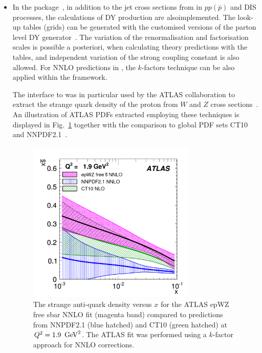 \begin{itemize}
\item In the \applgrid package~\cite{Carli:2010rw,APPLGRID:HepForge},
    in addition to the jet cross sections from \nlojetpp 
    in $pp(\bar p)$ and DIS processes, the calculations 
    of DY production are alsoimplemented. The look-up tables (grids) can be generated with
    the customised versions of the \mcfm parton level DY
    generator~\cite{Campbell:1999ah,Campbell:2000je,Campbell:2010ff}.  
    The variation of the renormalisation and factorisation scales is possible a posteriori,
    when calculating theory predictions with the \applgrid  tables, and
    independent variation of the strong coupling constant is also allowed.
    For NNLO predictions in \fitter, the $k$-factors technique can be also applied
    within the \applgrid framework.

    The \fitter interface to \applgrid was in particular used by the ATLAS
    collaboration to extract the strange quark density of the proton
    from $W$ and $Z$ cross sections~\cite{atlas:strange}. An
    illustration of ATLAS PDFs extracted employing these techniques
    is displayed in
    Fig.~\ref{fig:atlas} together with the comparison to global PDF
    sets CT10~\cite{CT10pdf} and NNPDF2.1~\cite{NNPDFpdf}.

\begin{figure}[!ht]
  \centering
  \includegraphics[width=8cm]{atlas.pdf}
  \caption{The strange anti-quark density versus $x$ for the ATLAS
    epWZ free sbar NNLO fit \cite{atlas:strange} (magenta band) compared to predictions
    from NNPDF2.1 (blue hatched) and CT10 (green hatched) 
    at $Q^2 = 1.9\ \,\text{Ge\hspace{-.08em}V}^2$. The ATLAS fit was performed using a $k$-factor approach 
    for NNLO corrections.}
  \label{fig:atlas}
\end{figure}


\end{itemize}

